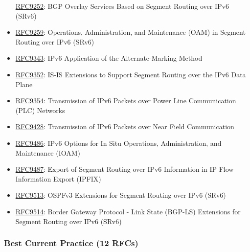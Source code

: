 \documentclass[
]{article}
\begin{document}
\begin{itemize}
  \href{https://www.rfc-editor.org/info/rfc9252}{RFC9252}: BGP Overlay
  Services Based on Segment Routing over IPv6 (SRv6)
\item
  \href{https://www.rfc-editor.org/info/rfc9259}{RFC9259}: Operations,
  Administration, and Maintenance (OAM) in Segment Routing over IPv6
  (SRv6)
\item
  \href{https://www.rfc-editor.org/info/rfc9343}{RFC9343}: IPv6
  Application of the Alternate-Marking Method
\item
  \href{https://www.rfc-editor.org/info/rfc9352}{RFC9352}: IS-IS
  Extensions to Support Segment Routing over the IPv6 Data Plane
\item
  \href{https://www.rfc-editor.org/info/rfc9354}{RFC9354}: Transmission
  of IPv6 Packets over Power Line Communication (PLC) Networks
\item
  \href{https://www.rfc-editor.org/info/rfc9428}{RFC9428}: Transmission
  of IPv6 Packets over Near Field Communication
\item
  \href{https://www.rfc-editor.org/info/rfc9486}{RFC9486}: IPv6 Options
  for In Situ Operations, Administration, and Maintenance (IOAM)
\item
  \href{https://www.rfc-editor.org/info/rfc9487}{RFC9487}: Export of
  Segment Routing over IPv6 Information in IP Flow Information Export
  (IPFIX)
\item
  \href{https://www.rfc-editor.org/info/rfc9513}{RFC9513}: OSPFv3
  Extensions for Segment Routing over IPv6 (SRv6)
\item
  \href{https://www.rfc-editor.org/info/rfc9514}{RFC9514}: Border
  Gateway Protocol - Link State (BGP-LS) Extensions for Segment Routing
  over IPv6 (SRv6)
\end{itemize}

\subsubsection{Best Current Practice (12
RFCs)}\label{best-current-practice-12-rfcs}
\end{document}
